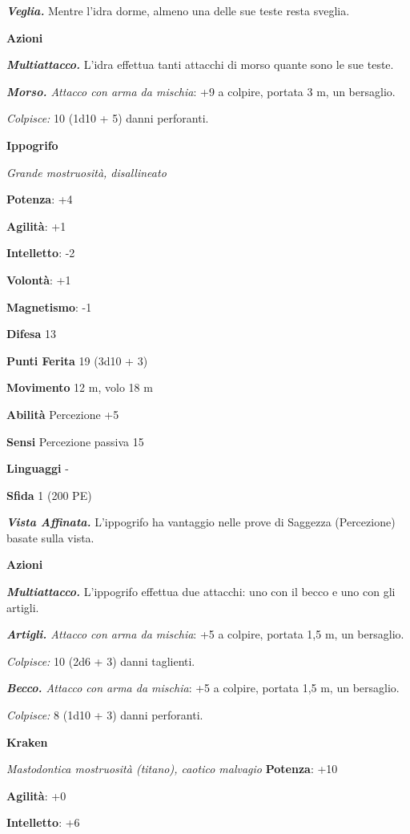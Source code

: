 \begin{multicols}{2}
\emph{\textbf{Veglia.}} Mentre l'idra dorme, almeno una delle sue teste
resta sveglia.

\textbf{Azioni}

\emph{\textbf{Multiattacco.}} L'idra effettua tanti attacchi di morso
quante sono le sue teste.

\emph{\textbf{Morso.} Attacco con arma da mischia}: +9 a colpire,
portata 3 m, un bersaglio.

\emph{Colpisce:} 10 (1d10 + 5) danni perforanti.

\textbf{Ippogrifo}

\emph{Grande mostruosità, disallineato}

\textbf{Potenza}: +4

\textbf{Agilità}: +1

\textbf{Intelletto}: -2

\textbf{Volontà}: +1

\textbf{Magnetismo}: -1

\textbf{Difesa} 13

\textbf{Punti Ferita} 19 (3d10 + 3)

\textbf{Movimento} 12 m, volo 18 m

\textbf{Abilità} Percezione +5

\textbf{Sensi} Percezione passiva 15

\textbf{Linguaggi} -

\textbf{Sfida} 1 (200 PE)

\emph{\textbf{Vista Affinata.}} L'ippogrifo ha vantaggio nelle prove di
Saggezza (Percezione) basate sulla vista.

\textbf{Azioni}

\emph{\textbf{Multiattacco.}} L'ippogrifo effettua due attacchi: uno con
il becco e uno con gli artigli.

\emph{\textbf{Artigli.} Attacco con arma da mischia}: +5 a colpire,
portata 1,5 m, un bersaglio.

\emph{Colpisce:} 10 (2d6 + 3) danni taglienti.

\emph{\textbf{Becco.} Attacco con arma da mischia}: +5 a colpire,
portata 1,5 m, un bersaglio.

\emph{Colpisce:} 8 (1d10 + 3) danni perforanti.

\textbf{Kraken}

\emph{Mastodontica mostruosità (titano), caotico malvagio}
\textbf{Potenza}: +10

\textbf{Agilità}: +0

\textbf{Intelletto}: +6


\end{multicols}
